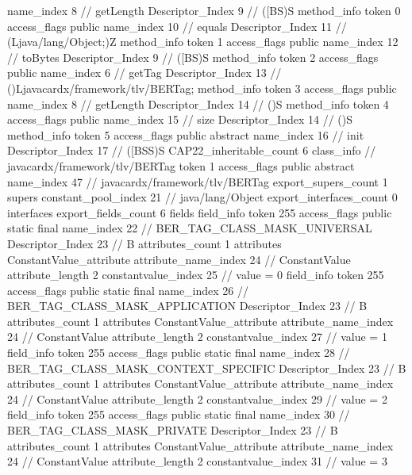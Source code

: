 {{{{{					name_index	8		// getLength
					Descriptor_Index	9		// ([BS)S
				}
				method_info {
					token	0
					access_flags	public
					name_index	10		// equals
					Descriptor_Index	11		// (Ljava/lang/Object;)Z
				}
				method_info {
					token	1
					access_flags	public
					name_index	12		// toBytes
					Descriptor_Index	9		// ([BS)S
				}
				method_info {
					token	2
					access_flags	public
					name_index	6		// getTag
					Descriptor_Index	13		// ()Ljavacardx/framework/tlv/BERTag;
				}
				method_info {
					token	3
					access_flags	public
					name_index	8		// getLength
					Descriptor_Index	14		// ()S
				}
				method_info {
					token	4
					access_flags	public
					name_index	15		// size
					Descriptor_Index	14		// ()S
				}
				method_info {
					token	5
					access_flags	public abstract
					name_index	16		// init
					Descriptor_Index	17		// ([BSS)S
				}
			}
			CAP22_inheritable_count	6
		}
		class_info {		// javacardx/framework/tlv/BERTag
			token	1
			access_flags	public abstract
			name_index	47		// javacardx/framework/tlv/BERTag
			export_supers_count	1
			supers {
				constant_pool_index	21		// java/lang/Object
			}
			export_interfaces_count	0
			interfaces {
			}
			export_fields_count	6
			fields {
			field_info {
				token	255
				access_flags	public static final
				name_index	22		// BER_TAG_CLASS_MASK_UNIVERSAL
				Descriptor_Index	23		// B
				attributes_count	1
				attributes {
				ConstantValue_attribute {
					attribute_name_index	24		// ConstantValue
					attribute_length	2
					constantvalue_index	25		// value = 0
				}
				}
			}
			field_info {
				token	255
				access_flags	public static final
				name_index	26		// BER_TAG_CLASS_MASK_APPLICATION
				Descriptor_Index	23		// B
				attributes_count	1
				attributes {
				ConstantValue_attribute {
					attribute_name_index	24		// ConstantValue
					attribute_length	2
					constantvalue_index	27		// value = 1
				}
				}
			}
			field_info {
				token	255
				access_flags	public static final
				name_index	28		// BER_TAG_CLASS_MASK_CONTEXT_SPECIFIC
				Descriptor_Index	23		// B
				attributes_count	1
				attributes {
				ConstantValue_attribute {
					attribute_name_index	24		// ConstantValue
					attribute_length	2
					constantvalue_index	29		// value = 2
				}
				}
			}
			field_info {
				token	255
				access_flags	public static final
				name_index	30		// BER_TAG_CLASS_MASK_PRIVATE
				Descriptor_Index	23		// B
				attributes_count	1
				attributes {
				ConstantValue_attribute {
					attribute_name_index	24		// ConstantValue
					attribute_length	2
					constantvalue_index	31		// value = 3
}}}}}}}
